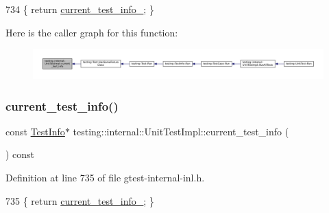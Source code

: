 \begin{DoxyCode}
734 \{ \textcolor{keywordflow}{return} \hyperlink{classtesting_1_1internal_1_1UnitTestImpl_a56128aac0fb5be45993715d1130b0610}{current\_test\_info\_}; \}
\end{DoxyCode}
Here is the caller graph for this function\+:
\nopagebreak
\begin{figure}[H]
\begin{center}
\leavevmode
\includegraphics[width=350pt]{classtesting_1_1internal_1_1UnitTestImpl_a8d303ebdcf5989e96d3ed96fb7255102_icgraph}
\end{center}
\end{figure}
\mbox{\label{classtesting_1_1internal_1_1UnitTestImpl_a5e4cc3139e60371bd7898033c9b1c56d}} 
\subsubsection{\texorpdfstring{current\+\_\+test\+\_\+info()}{current\_test\_info()}\hspace{0.1cm}{\footnotesize\ttfamily [2/2]}}
{\footnotesize\ttfamily const \hyperlink{classtesting_1_1TestInfo}{Test\+Info}$\ast$ testing\+::internal\+::\+Unit\+Test\+Impl\+::current\+\_\+test\+\_\+info (\begin{DoxyParamCaption}{ }\end{DoxyParamCaption}) const\hspace{0.3cm}{\ttfamily [inline]}}



Definition at line 735 of file gtest-\/internal-\/inl.\+h.


\begin{DoxyCode}
735 \{ \textcolor{keywordflow}{return} \hyperlink{classtesting_1_1internal_1_1UnitTestImpl_a56128aac0fb5be45993715d1130b0610}{current\_test\_info\_}; \}
\end{DoxyCode}
\mbox{\label{classtesting_1_1internal_1_1UnitTestImpl_aba3caef4ad23ce98be80250aeb0cc787}} 
